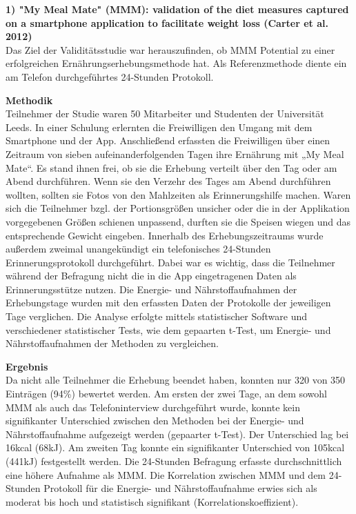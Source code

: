\textbf{1) "My Meal Mate" (MMM): validation of the diet measures captured on a smartphone application to facilitate weight loss (Carter et al. 2012)}\\
Das Ziel der Validitätsstudie war herauszufinden, ob MMM Potential zu einer erfolgreichen Ernährungserhebungsmethode hat. Als Referenzmethode diente ein am Telefon durchgeführtes 24-Stunden Protokoll.

\textbf{Methodik}\\
Teilnehmer der Studie waren 50 Mitarbeiter und Studenten der Universität Leeds. In einer Schulung erlernten  die Freiwilligen den Umgang mit dem Smartphone und der App. Anschließend erfassten die Freiwilligen über einen Zeitraum von sieben aufeinanderfolgenden Tagen ihre Ernährung mit „My Meal Mate“. Es stand ihnen frei, ob sie die Erhebung verteilt über den Tag oder am Abend durchführen. Wenn sie den Verzehr des Tages am Abend durchführen wollten, sollten sie Fotos von den Mahlzeiten als Erinnerungshilfe machen. Waren sich die Teilnehmer bzgl. der Portionsgrößen unsicher oder die in der Applikation vorgegebenen Größen schienen unpassend, durften sie die Speisen wiegen und das entsprechende Gewicht eingeben. Innerhalb des Erhebungszeitraums wurde außerdem zweimal unangekündigt ein telefonisches 24-Stunden Erinnerungsprotokoll durchgeführt. Dabei war es wichtig, dass die Teilnehmer während der Befragung nicht die in die App eingetragenen Daten als Erinnerungsstütze nutzen. Die Energie- und Nährstoffaufnahmen der Erhebungstage wurden mit den erfassten Daten der Protokolle der jeweiligen Tage verglichen.
Die Analyse erfolgte mittels statistischer Software und verschiedener statistischer Tests, wie dem gepaarten t-Test, um Energie- und Nährstoffaufnahmen der Methoden zu vergleichen.

\textbf{Ergebnis}\\
Da nicht alle Teilnehmer die Erhebung beendet haben, konnten nur 320 von 350 Einträgen (94\%) bewertet werden.  
Am ersten der zwei Tage, an dem  sowohl MMM als auch das Telefoninterview durchgeführt wurde, konnte kein signifikanter Unterschied  zwischen den Methoden bei der Energie- und Nährstoffaufnahme aufgezeigt werden (gepaarter t-Test). Der Unterschied lag bei 16kcal (68kJ). Am zweiten Tag konnte ein signifikanter Unterschied von 105kcal (441kJ) festgestellt werden. Die 24-Stunden Befragung erfasste durchschnittlich eine höhere Aufnahme als MMM. Die Korrelation zwischen MMM und dem 24-Stunden Protokoll für die Energie- und Nährstoffaufnahme erwies sich als moderat bis hoch und statistisch signifikant  (Korrelationskoeffizient).\\


